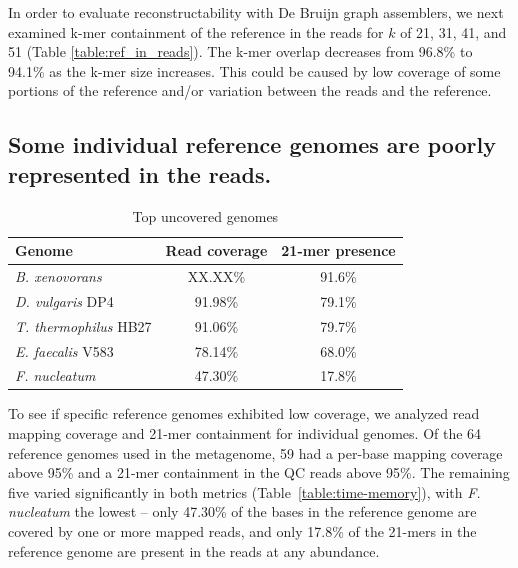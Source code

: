 \documentclass[10pt,a4paper,twocolumn]{article}
\begin{document}
In order to evaluate reconstructability with De Bruijn graph
assemblers, we next examined k-mer containment of the reference in the
reads for $k$ of 21, 31, 41, and 51 (Table \ref{table:ref_in_reads}).
The k-mer overlap decreases from 96.8\% to 94.1\% as the k-mer size
increases. This could be caused by low coverage of some portions
of the reference and/or variation between the reads and the reference.



\subsection*{Some individual reference genomes are poorly represented in the reads.}

\begin{table}[!h]
\centering
\caption{Top uncovered genomes}
\begin{tabular}{|l|c|c|}\hline
\textbf{Genome} & \textbf {Read coverage} & \textbf{21-mer presence} \\ \hline 
{{\em B. xenovorans}} & XX.XX\% & 91.6\% \\
\hline
{{\em D. vulgaris} DP4}  & 91.98\% & 79.1\% \\
\hline
{{\em T. thermophilus} HB27}  & 91.06\% & 79.7\% \\
\hline    
{{\em E. faecalis} V583}  & 78.14\% & 68.0\% \\
\hline
{{\em F. nucleatum}}  & 47.30\% & 17.8\% \\
\hline
\end{tabular}
\label{table:genomes_uncovered-analysis}
\end{table}



To see if specific reference genomes exhibited low coverage, we
analyzed read mapping coverage and 21-mer containment for individual
genomes.  Of the 64 reference genomes used in the metagenome,
59 had a per-base mapping coverage above 95\% and a 21-mer containment in
the QC reads above 95\%.  The remaining five varied significantly
in both metrics (Table~\ref{table:time-memory}), with {\em F. nucleatum}
the lowest -- only 47.30\% of the bases in the reference genome are
covered by one or more mapped reads, and only 17.8\% of the 21-mers
in the reference genome are present in the reads at any abundance.
\end{document}

